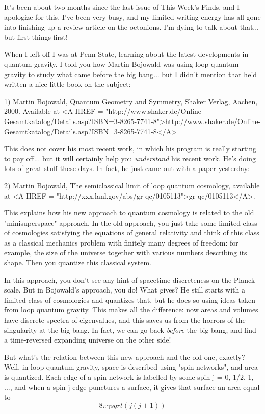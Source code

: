 

It's been about two months since the last issue of This Week's Finds,
and I apologize for this.  I've been very busy, and my limited writing
energy has all gone into finishing up a review article on the octonions.
I'm dying to talk about that... but first things first!

When I left off I was at Penn State, learning about the latest
developments in quantum gravity.  I told you how Martin Bojowald was
using loop quantum gravity to study what came before the big bang... 
but I didn't mention that he'd written a nice little book on the subject:

1) Martin Bojowald, Quantum Geometry and Symmetry, Shaker Verlag,
Aachen, 2000.  Available at 
<A HREF = "http://www.shaker.de/Online-Gesamtkatalog/Details.asp?ISBN=3-8265-7741-8">http://www.shaker.de/Online-Gesamtkatalog/Details.asp?ISBN=3-8265-7741-8</A>

This does not cover his most recent work, in which his program is really
starting to pay off... but it will certainly help you \emph{understand} his
recent work.  He's doing lots of great stuff these days.  In fact, he
just came out with a paper yesterday:

2) Martin Bojowald, The semiclassical limit of loop quantum
cosmology, available at <A HREF = "http://xxx.lanl.gov/abs/gr-qc/0105113">gr-qc/0105113</A>.

This explains how his new approach to quantum cosmology is related to
the old "minisuperspace" approach.  In the old approach, you
just take some limited class of cosmologies satisfying the equations of
general relativity and think of this class as a classical mechanics
problem with finitely many degrees of freedom: for example, the size of
the universe together with various numbers describing its shape.  Then
you quantize this classical system.

In this approach, you don't see any hint of spacetime discreteness on
the Planck scale.  But in Bojowald's approach, you do!  What gives?  He
still starts with a limited class of cosmologies and quantizes that, but
he does so using ideas taken from loop quantum gravity.  This makes all
the difference: now areas and volumes have discrete spectra of
eigenvalues, and this saves us from the horrors of the singularity at
the big bang.  In fact, we can go back \emph{before} the big bang, 
and find a time-reversed expanding universe on the other side!

But what's the relation between this new approach and the old one,
exactly?  Well, in loop quantum gravity, space is described using "spin
networks", and area is quantized.  Each edge of a spin network is
labelled by some spin j = 0, 1/2, 1, ..., and when a spin-j edge
punctures a surface, it gives that surface an area equal to
$$
                8 \pi  \gamma  sqrt(j(j+1))
$$
    
